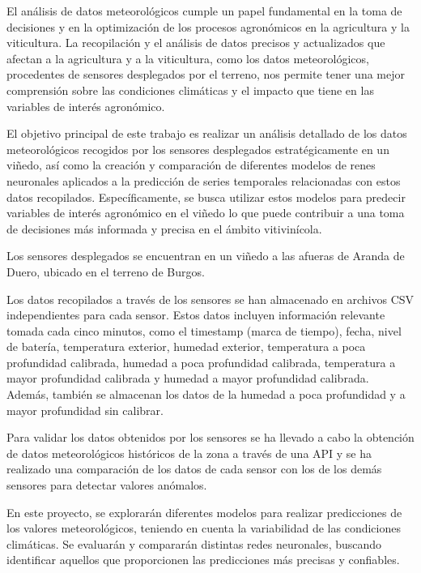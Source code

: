 
El análisis de datos meteorológicos cumple un papel fundamental en la toma de decisiones y en la optimización de los procesos agronómicos en la agricultura y la viticultura. La recopilación y el análisis de datos precisos y actualizados que afectan a la agricultura y a la viticultura, como los datos meteorológicos, procedentes de sensores desplegados por el terreno, nos permite tener una mejor comprensión sobre las condiciones climáticas y el impacto que tiene en las variables de interés agronómico.

\par

El objetivo principal de este trabajo es realizar un análisis detallado de los datos meteorológicos recogidos por los sensores desplegados estratégicamente en un viñedo, así como la creación y comparación de diferentes modelos de renes neuronales aplicados a la predicción de series temporales relacionadas con estos datos recopilados. Específicamente, se busca utilizar estos modelos para predecir variables de interés agronómico en el viñedo lo que puede contribuir a una toma de decisiones más informada y precisa en el ámbito vitivinícola.

\par

Los sensores desplegados se encuentran en un viñedo a las afueras de Aranda de Duero, ubicado en el terreno de Burgos.

\par

Los datos recopilados a través de los sensores se han almacenado en archivos CSV independientes para cada sensor. Estos datos incluyen información relevante tomada cada cinco minutos, como el timestamp (marca de tiempo), fecha, nivel de batería, temperatura exterior, humedad exterior, temperatura a poca profundidad calibrada, humedad a poca profundidad calibrada, temperatura a mayor profundidad calibrada y humedad a mayor profundidad calibrada. Además, también se almacenan los datos de la humedad a poca profundidad y a mayor profundidad sin calibrar.

\par

Para validar los datos obtenidos por los sensores se ha llevado a cabo la obtención de datos meteorológicos históricos de la zona a través de una API y se ha realizado una comparación de los datos de cada sensor con los de los demás sensores para detectar valores anómalos.

\par

En este proyecto, se explorarán diferentes modelos para realizar predicciones de los valores meteorológicos, teniendo en cuenta la variabilidad de las condiciones climáticas. Se evaluarán y compararán distintas redes neuronales, buscando identificar aquellos que proporcionen las predicciones más precisas y confiables.